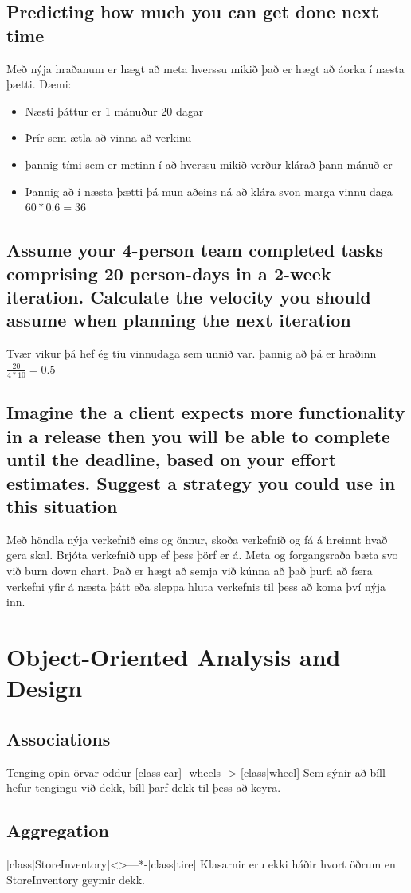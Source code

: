\documentclass[openany]{article}
\begin{document}
\subsection{Predicting how much you can get done next time}
Með nýja hraðanum er hægt að meta hverssu mikið það er hægt að áorka í næsta þætti. Dæmi:
\begin{itemize}
	\item Næsti þáttur er 1 mánuður 20 dagar
	\item Þrír sem ætla að vinna að verkinu
	\item þannig tími sem er metinn í að hverssu mikið verður klárað þann mánuð er
	\item Þannig að í næsta þætti þá mun aðeins ná að klára svon marga vinnu daga $60 * 0.6 = 36$
\end{itemize}
\subsection{Assume your 4-person team completed tasks comprising 20 person-days in a 2-week iteration. Calculate the velocity you should assume when planning the next iteration}
Tvær vikur þá hef ég tíu vinnudaga sem unnið var. þannig að þá er hraðinn $\frac{20}{4*10} = 0.5$
\subsection{Imagine the a client expects more functionality in a release then you will be able to complete until the deadline, based on your effort estimates. Suggest a strategy you could use in this situation}
Með höndla nýja verkefnið eins og önnur, skoða verkefnið og fá á hreinnt hvað gera skal. Brjóta verkefnið upp ef þess þörf er á. Meta og forgangsraða bæta svo við burn down chart. Það er hægt að semja við kúnna að það þurfi að færa verkefni yfir á næsta þátt eða sleppa hluta verkefnis til þess að koma því nýja inn.

\section{Object-Oriented Analysis and Design}
\subsection{Associations}
Tenging opin örvar oddur [class|car] -wheels -> [class|wheel] Sem sýnir að bíll hefur tengingu við dekk, bíll þarf dekk til þess að keyra.
\subsection{Aggregation}
[class|StoreInventory]<>---*-[class|tire] Klasarnir eru ekki háðir hvort öðrum en StoreInventory geymir dekk.
\end{document}
